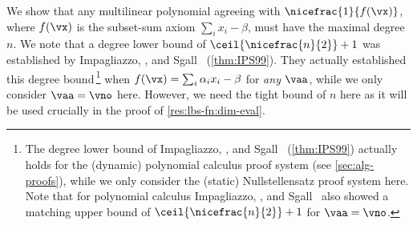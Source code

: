 \documentclass{toc}
\begin{document}
We show that any multilinear polynomial agreeing with $\nicefrac{1}{f(\vx)}$, where $f(\vx)$ is the subset-sum axiom $\sum_i x_i-\beta$, must have the maximal degree $n$.  We note that a degree lower bound of $\ceil{\nicefrac{n}{2}}+1$ was established by Impagliazzo, \Pudlak, and Sgall~\cite{IPS99} (\autoref{thm:IPS99}).  They actually established this degree bound\,\footnote{The degree lower bound of Impagliazzo, \Pudlak, and Sgall~\cite{IPS99} (\autoref{thm:IPS99}) actually holds for the (dynamic) polynomial calculus proof system (see \autoref{sec:alg-proofs}), while we only consider the (static) Nullstellensatz proof system here.  Note that for polynomial calculus Impagliazzo, \Pudlak, and Sgall~\cite{IPS99} also showed a matching upper bound of $\ceil{\nicefrac{n}{2}}+1$ for $\vaa=\vno$.}  when $f(\vx)=\sum_i \alpha_i x_i-\beta$ for \emph{any} $\vaa$, while we only consider $\vaa=\vno$ here.  However, we need the tight bound of $n$ here as it will be used crucially in the proof of \autoref{res:lbs-fn:dim-eval}.
\end{document}
